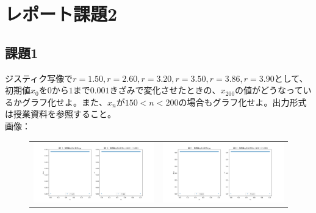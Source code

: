 \section{レポート課題2}
\subsection{課題1}
ジスティク写像で$r = 1.50, r = 2.60, r = 3.20, r = 3.50, r = 3.86, r = 3.90$として、初期値$x_0$を$0$から$1$まで$0.001$きざみで変化させたときの、$x_{200}$の値がどうなっているかグラフ化せよ。また、$x_n$が$150 < n < 200$の場合もグラフ化せよ。出力形式は授業資料を参照すること。\\
画像：\\
\begin{figure}[htbp]
  \begin{tabular}{cc}
    \begin{minipage}[t]{0.45\hsize}
      \centering
      \includegraphics[keepaspectratio, scale=0.25]{images/Problem2/ctest3_1.png}
    \end{minipage} &
    \begin{minipage}[t]{0.45\hsize}
      \centering
      \includegraphics[keepaspectratio, scale=0.25]{images/Problem2/ctest3_2.png}
    \end{minipage} \\


\end{tabular}
\end{figure}
